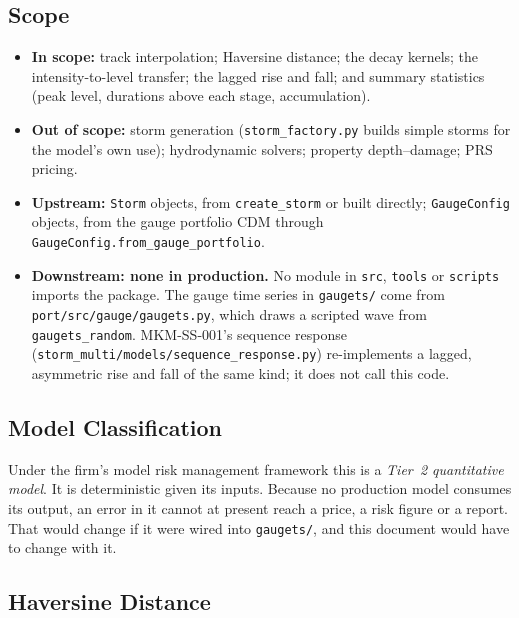 \documentclass[11pt,a4paper]{article}
\begin{document}
\subsection{Scope}
\label{sec:scope}
\begin{itemize}[nosep]
    \item \textbf{In scope:} track interpolation; Haversine distance; the decay kernels;
          the intensity-to-level transfer; the lagged rise and fall; and summary
          statistics (peak level, durations above each stage, accumulation).
    \item \textbf{Out of scope:} storm generation (\texttt{storm\_factory.py} builds
          simple storms for the model's own use); hydrodynamic solvers; property
          depth--damage; PRS pricing.
    \item \textbf{Upstream:} \texttt{Storm} objects, from \texttt{create\_storm} or
          built directly; \texttt{GaugeConfig} objects, from the gauge portfolio CDM
          through \texttt{GaugeConfig.from\_gauge\_portfolio}.
    \item \textbf{Downstream: none in production.} No module in \texttt{src},
          \texttt{tools} or \texttt{scripts} imports the package. The gauge time series
          in \texttt{gaugets/} come from \texttt{port/src/gauge/gaugets.py}, which
          draws a scripted wave from \texttt{gaugets\_random}. MKM-SS-001's sequence
          response (\texttt{storm\_multi/models/sequence\_response.py}) re-implements
          a lagged, asymmetric rise and fall of the same kind; it does not call this
          code.
\end{itemize}

\subsection{Model Classification}
Under the firm's model risk management framework this is a \emph{Tier~2 quantitative
model}. It is deterministic given its inputs. Because no production model consumes its
output, an error in it cannot at present reach a price, a risk figure or a report. That
would change if it were wired into \texttt{gaugets/}, and this document would have to
change with it.

\mkmframework

\subsection{Haversine Distance}
\label{sec:haversine}
\end{document}
